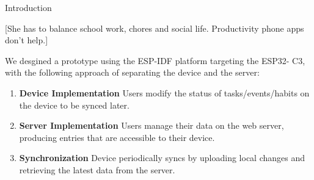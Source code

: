 \documentclass[final]{beamer}
\newlength{\colwidth}
\begin{document}
\begin{frame}[t]
\begin{columns}[t]
\begin{column}{\colwidth}
\begin{block}{Introduction}
\begin{minipage}[t]{0.65\linewidth}
          [She has to balance school work, chores and social life. Productivity phone apps don't help.]
        \end{minipage}

        
        We desgined a prototype using the ESP-IDF platform targeting the ESP32-
        C3, with the following approach of separating the device and the 
        server:

        \begin{enumerate}
          \item \textbf{Device Implementation} Users modify the status of 
            tasks/events/habits on the device to be synced later.
          \item \textbf{Server Implementation} Users manage their data on the
            web server, producing entries that are accessible to their device.
          \item \textbf{Synchronization} Device periodically syncs by uploading
            local changes and retrieving the latest data from the server. 
        \end{enumerate}

      \end{block}


\end{column}
\end{columns}
\end{frame}
\end{document}
